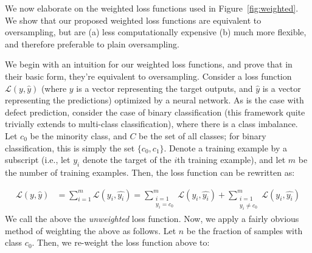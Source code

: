 \documentclass[10pt,compsoc,twocolumn]{IEEEtran}
\begin{document}
 

We now elaborate on the weighted loss functions used in
Figure~\ref{fig:weighted}. We show that our proposed weighted loss functions are equivalent to oversampling, but are (a) less computationally expensive (b) much more flexible, and therefore preferable to plain oversampling.

We begin with an intuition for our weighted loss functions, and prove that in their basic form, they're equivalent to oversampling. Consider a loss function $\mathcal{L}(y, \hat{y})$ (where $y$ is a vector representing the target outputs, and $\hat{y}$ is a vector representing the predictions) optimized by a neural network. As is the case with defect prediction, consider the case of binary classification (this framework quite trivially extends to multi-class classification), where there is a class imbalance. Let $c_0$ be the minority class, and $C$ be the set of all classes; for binary classification, this is simply the set $\{c_0, c_1\}$. Denote a training example by a subscript (i.e., let $y_i$ denote the target of the $i$th training example), and let $m$ be the number of training examples. Then, the loss function can be rewritten as:




\[
    \begin{aligned}
    \mathcal{L}(y, \hat{y}) &= \sum_{i=1}^m \mathcal{L}(y_i, \hat{y_i}) \nonumber = \sum_{\substack{i=1 \\ y_i = c_0}}^m \mathcal{L}(y_i, \hat{y_i}) + \sum_{\substack{i=1 \\ y_i \neq c_0}}^m \mathcal{L}(y_i, \hat{y_i})
    \end{aligned}
\]
We call the above the \textit{unweighted} loss function. Now, we apply a fairly obvious method of weighting the above as follows. Let $n$ be the fraction of samples with class $c_0$. Then, we re-weight the loss function above to:
\end{document}
